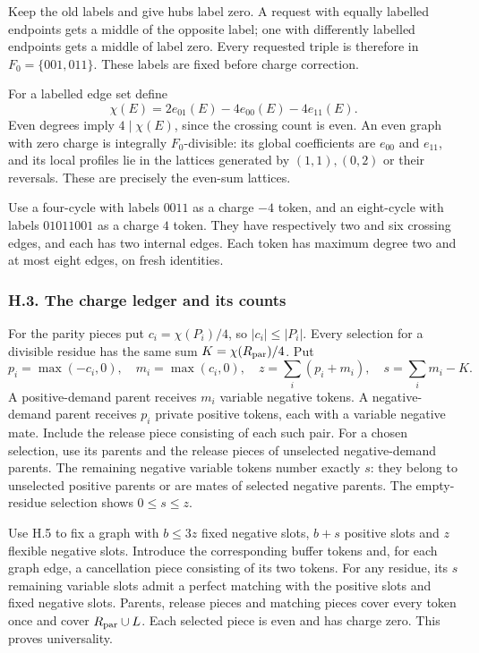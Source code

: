 \documentclass[english,11pt,a4paper]{article}
\begin{document}
Keep the old labels and give hubs label zero. A request with equally labelled endpoints gets a middle of the opposite label; one with differently labelled endpoints gets a middle of label zero. Every requested triple is therefore in \(F_0=\{001,011\}\). These labels are fixed before charge correction.

For a labelled edge set define \[\chi(E)=2e_{01}(E)-4e_{00}(E)-4e_{11}(E).\] Even degrees imply \(4\mid\chi(E)\), since the crossing count is even. An even graph with zero charge is integrally \(F_0\)-divisible: its global coefficients are \(e_{00}\) and \(e_{11}\), and its local profiles lie in the lattices generated by \((1,1),(0,2)\) or their reversals. These are precisely the even-sum lattices.

Use a four-cycle with labels \(0011\) as a charge \(-4\) token, and an eight-cycle with labels \(01011001\) as a charge \(4\) token. They have respectively two and six crossing edges, and each has two internal edges. Each token has maximum degree two and at most eight edges, on fresh identities.

\subsubsection{H.3. The charge ledger and its counts}\label{h.3.-the-charge-ledger-and-its-counts}

For the parity pieces put \(c_i=\chi(P_i)/4\), so \(|c_i|\le|P_i|\). Every selection for a divisible residue has the same sum \(K=\chi(R_{\rm par})/4\). Put \[p_i=\max(-c_i,0),\quad m_i=\max(c_i,0),\quad
z=\sum_i(p_i+m_i),\quad s=\sum_i m_i-K.\] A positive-demand parent receives \(m_i\) variable negative tokens. A negative-demand parent receives \(p_i\) private positive tokens, each with a variable negative mate. Include the release piece consisting of each such pair. For a chosen selection, use its parents and the release pieces of unselected negative-demand parents. The remaining negative variable tokens number exactly \(s\): they belong to unselected positive parents or are mates of selected negative parents. The empty-residue selection shows \(0\le s\le z\).

Use H.5 to fix a graph with \(b\le3z\) fixed negative slots, \(b+s\) positive slots and \(z\) flexible negative slots. Introduce the corresponding buffer tokens and, for each graph edge, a cancellation piece consisting of its two tokens. For any residue, its \(s\) remaining variable slots admit a perfect matching with the positive slots and fixed negative slots. Parents, release pieces and matching pieces cover every token once and cover \(R_{\rm par}\cup L\). Each selected piece is even and has charge zero. This proves universality.
\end{document}
